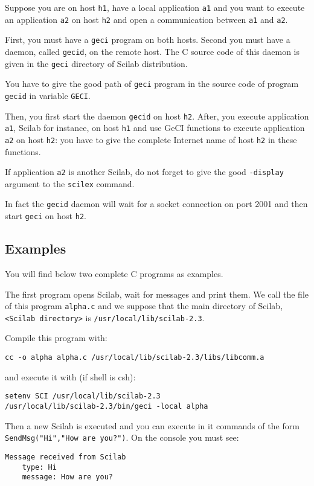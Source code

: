 \documentclass[11pt]{article}
\newcommand{\T}[1]{\texttt{#1}}
\begin{document}
Suppose you are on host \T{h1}, have a local application \T{a1} and
you want to execute an application \T{a2} on host \T{h2} and open a
communication between \T{a1} and \T{a2}.

First, you must have a \T{geci} program on both hosts. Second you must
have a daemon, called \T{gecid}, on the remote host. The C source code
of this daemon is given in the \T{geci} directory of Scilab
distribution.

You have to give the good path of \T{geci} program in the source code
of program \T{gecid} in variable \T{GECI}.

Then, you first start the daemon \T{gecid} on host \T{h2}. 
After, you execute application \T{a1}, Scilab for instance, on host
\T{h1} and use GeCI functions to execute application \T{a2} on host \T{h2}:
you have to give the complete Internet name of host \T{h2} in these
functions.

If application \T{a2} is another Scilab, do not forget to give the
good \T{-display} argument to the \T{scilex} command.

In fact the \T{gecid} daemon will wait for a socket connection on port
2001 and then start \T{geci} on host \T{h2}.

\subsection{Examples}\label{examples}

You will find below two complete C programs as examples.

The first program opens Scilab,
wait for messages and print them. We call the file of this program 
\T{alpha.c}
and we suppose that the main directory of Scilab, 
\verb|<Scilab directory>| is \T{/usr/local/lib/scilab-2.3}.

Compile this program with:
 
\begin{verbatim}
cc -o alpha alpha.c /usr/local/lib/scilab-2.3/libs/libcomm.a
\end{verbatim}

and execute it with (if shell is csh):

\begin{verbatim}
setenv SCI /usr/local/lib/scilab-2.3
/usr/local/lib/scilab-2.3/bin/geci -local alpha
\end{verbatim} 

Then a new Scilab is executed and you can execute in it commands of the form
\T{SendMsg("Hi","How are you?")}. On the console you must see:
\begin{verbatim}
Message received from Scilab
    type: Hi
    message: How are you?
\end{verbatim}
\end{document}
